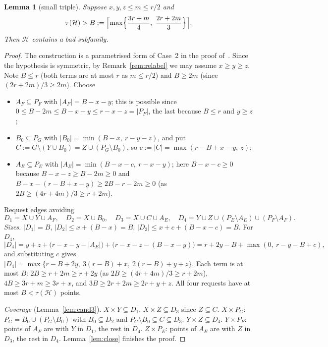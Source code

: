 \documentclass[11pt]{amsart}
\newtheorem{lemma}[theorem]{Lemma}
\theoremstyle{definition}
\theoremstyle{remark}
\newcommand{\cH}{\mathcal H}
\begin{document}
\begin{lemma}[small triple]\label{lem:L18}
Suppose $x,y,z\le m\le r/2$ and
\[
\tau(\cH)>B:=\Bigl\lceil\max\Bigl\{\frac{3r+m}{4},\ \frac{2r+2m}{3}\Bigr\}\Bigr\rceil .
\]
Then $\cH$ contains a bad subfamily.
\end{lemma}
\begin{proof}
The construction is a parametrised form of Case~2 in the proof of~\cite[Lemma~1]{FKW}. Since the hypothesis is symmetric, by Remark~\ref{rem:relabel} we may assume $x\ge y\ge z$. Note $B\le r$ (both terms are at most $r$ as $m\le r/2$) and $B\ge 2m$ (since $(2r+2m)/3\ge2m$). Choose
\begin{itemize}
\item $A_F\subseteq P_F$ with $|A_F|=B-x-y$; this is possible since $0\le B-2m\le B-x-y\le r-x-z=|P_F|$, the last because $B\le r$ and $y\ge z$;
\item $B_0\subseteq P_G$ with $|B_0|=\min(B-x,\ r-y-z)$, and put $C:=G\setminus(Y\cup B_0)=Z\cup(P_G\setminus B_0)$, so $c:=|C|=\max(r-B+x-y,\ z)$;
\item $A_E\subseteq P_E$ with $|A_E|=\min(B-x-c,\ r-x-y)$; here $B-x-c\ge0$ because $B-x-z\ge B-2m\ge0$ and $B-x-(r-B+x-y)\ge 2B-r-2m\ge0$ (as $2B\ge(4r+4m)/3\ge r+2m$).
\end{itemize}
Request edges avoiding
\[
D_1=X\cup Y\cup A_F,\quad D_2=X\cup B_0,\quad D_3=X\cup C\cup A_E,\quad D_4=Y\cup Z\cup(P_E\setminus A_E)\cup(P_F\setminus A_F).
\]
\emph{Sizes.} $|D_1|=B$, $|D_2|\le x+(B-x)=B$, $|D_3|\le x+c+(B-x-c)=B$. For $D_4$,
\[
|D_4|=y+z+\bigl(r-x-y-|A_E|\bigr)+\bigl(r-x-z-(B-x-y)\bigr)=r+2y-B+\max(0,\ r-y-B+c),
\]
and substituting $c$ gives $|D_4|=\max\{r-B+2y,\ 3(r-B)+x,\ 2(r-B)+y+z\}$. Each term is at most $B$: $2B\ge r+2m\ge r+2y$ (as $2B\ge(4r+4m)/3\ge r+2m$), $4B\ge3r+m\ge3r+x$, and $3B\ge2r+2m\ge2r+y+z$. All four requests have at most $B<\tau(\cH)$ points.

\emph{Coverage} (Lemma~\ref{lem:cand3}). $X\times Y\subseteq D_1$. $X\times Z\subseteq D_3$ since $Z\subseteq C$. $X\times P_G$: $P_G=B_0\cup(P_G\setminus B_0)$ with $B_0\subseteq D_2$ and $P_G\setminus B_0\subseteq C\subseteq D_3$. $Y\times Z\subseteq D_4$. $Y\times P_F$: points of $A_F$ are with $Y$ in $D_1$, the rest in $D_4$. $Z\times P_E$: points of $A_E$ are with $Z$ in $D_3$, the rest in $D_4$. Lemma~\ref{lem:close} finishes the proof.
\end{proof}
\end{document}
